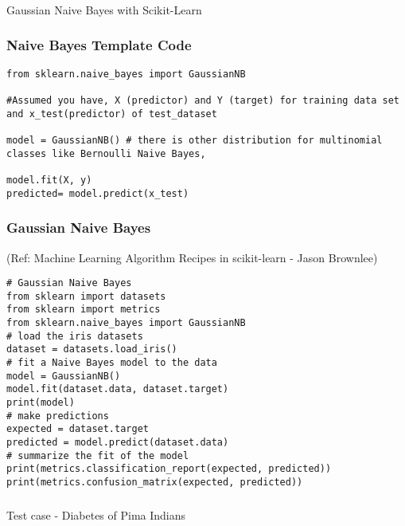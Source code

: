 \begin{frame}[fragile]\frametitle{}
\begin{center}
{\Large Gaussian Naive Bayes with Scikit-Learn}
\end{center}
\end{frame}

\begin{frame}[fragile]\frametitle{Naive Bayes Template Code}
\begin{lstlisting}
from sklearn.naive_bayes import GaussianNB 

#Assumed you have, X (predictor) and Y (target) for training data set and x_test(predictor) of test_dataset 

model = GaussianNB() # there is other distribution for multinomial classes like Bernoulli Naive Bayes, 

model.fit(X, y) 
predicted= model.predict(x_test) 
\end{lstlisting}
\end{frame}



\begin{frame}[fragile]\frametitle{Gaussian Naive Bayes}

{\tiny (Ref: Machine Learning Algorithm Recipes in scikit-learn - Jason Brownlee)}


\begin{lstlisting}
# Gaussian Naive Bayes
from sklearn import datasets
from sklearn import metrics
from sklearn.naive_bayes import GaussianNB
# load the iris datasets
dataset = datasets.load_iris()
# fit a Naive Bayes model to the data
model = GaussianNB()
model.fit(dataset.data, dataset.target)
print(model)
# make predictions
expected = dataset.target
predicted = model.predict(dataset.data)
# summarize the fit of the model
print(metrics.classification_report(expected, predicted))
print(metrics.confusion_matrix(expected, predicted))
\end{lstlisting}



\end{frame}




\begin{frame}[fragile]\frametitle{}
\begin{center}
{\Large Test case - Diabetes of Pima Indians}
\end{center}
\end{frame}


